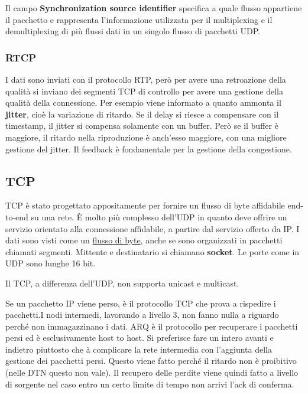 \documentclass{article}
\begin{document}
\noindent Il campo \textbf{Synchronization source identifier} specifica a quale flusso appartiene il pacchetto e rappresenta
 l'informazione utilizzata per il multiplexing e il demultiplexing di più flussi dati in un singolo flusso di pacchetti UDP.



\subsubsection{RTCP}
I dati sono inviati con il protocollo RTP, però per avere una retroazione della qualità si inviano dei segmenti TCP di controllo per avere una gestione della qualità della connessione.
Per esempio viene informato a quanto ammonta il \textbf{jitter}, cioè la variazione di ritardo. Se il delay si riesce a compensare con il timestamp, il jitter si compensa solamente
con un buffer. Però se il buffer è maggiore, il ritardo nella riproduzione è anch'esso maggiore, con una migliore gestione del jitter.
Il feedback è fondamentale per la gestione della congestione.

\subsection{TCP}
\noindent TCP è stato progettato appositamente per fornire un flusso di byte affidabile end-to-end su una rete. È molto più 
complesso dell'UDP in quanto deve offrire un servizio orientato alla connessione affidabile, a partire dal servizio offerto da IP. I dati 
sono visti come un \underline{flusso di byte}, anche se sono organizzati in pacchetti chiamati segmenti. Mittente e destinatario si 
chiamano \textbf{socket}. Le porte come in UDP sono lunghe 16 bit.


\noindent Il TCP, a differenza dell'UDP, non supporta unicast e multicast.

\noindent Se un pacchetto IP viene perso, è il protocollo TCP che prova a rispedire i pacchetti.I nodi intermedi, lavorando a livello 3, non fanno nulla a riguardo perché non
immagazzinano i dati. ARQ è il protocollo per recuperare i pacchetti persi ed è esclusivamente host to host. Si preferisce fare un intero avanti e indietro piuttosto che à
complicare la rete intermedia con l'aggiunta della gestione dei pacchetti persi. Questo viene fatto perché il ritardo non è proibitivo (nelle DTN questo non vale). 
Il recupero delle perdite viene quindi fatto a livello di sorgente nel caso entro un certo limite di tempo non arrivi l'ack di conferma.
\end{document}
